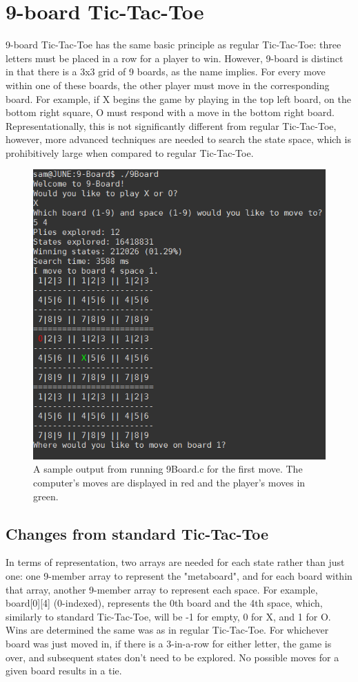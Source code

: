 \documentclass{article}
\begin{document}
\section{9-board Tic-Tac-Toe}
9-board Tic-Tac-Toe has the same basic principle as regular Tic-Tac-Toe: three letters must be placed in a row for a player to win. However, 9-board is distinct in that there is a 3x3 grid of 9 boards, as the name implies. For every move within one of these boards, the other player must move in the corresponding board. For example, if X begins the game by playing in the top left board, on the bottom right square, O must respond with a move in the bottom right board. Representationally, this is not significantly different from regular Tic-Tac-Toe, however, more advanced techniques are needed to search the state space, which is prohibitively large when compared to regular Tic-Tac-Toe.

\begin{figure}[H]
	\centering
	\includegraphics[width=0.75\linewidth]{9BoardScreen.png}\\
	A sample output from running 9Board.c for the first move. The computer's moves are displayed in red and the player's moves in green.
\end{figure}
\subsection{Changes from standard Tic-Tac-Toe}
In terms of representation, two arrays are needed for each state rather than just one: one 9-member array to represent the "metaboard", and for each board within that array, another 9-member array to represent each space. For example, board[0][4] (0-indexed), represents the 0th board and the 4th space, which, similarly to standard Tic-Tac-Toe, will be -1 for empty, 0 for X, and 1 for O. Wins are determined the same was as in regular Tic-Tac-Toe. For whichever board was just moved in, if there is a 3-in-a-row for either letter, the game is over, and subsequent states don't need to be explored. No possible moves for a given board results in a tie.
\end{document}
